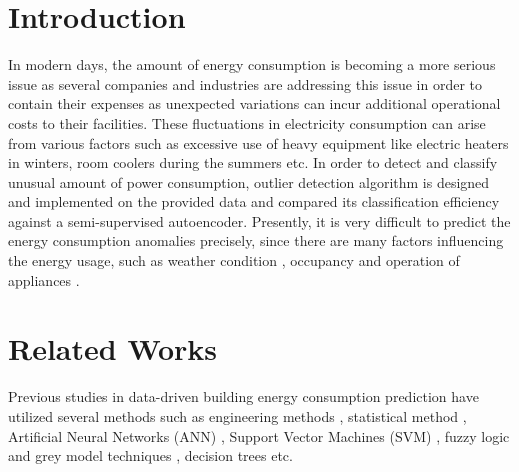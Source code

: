 \documentclass[conference]{IEEEtran}
\begin{document}

\section{Introduction}
In modern days, the amount of energy consumption is becoming a more serious issue as several companies and industries are addressing this issue in order to contain their expenses as unexpected variations can incur additional operational costs to their facilities. These fluctuations in electricity consumption can arise from various factors such as excessive use of heavy equipment like electric heaters in winters, room coolers during the summers etc. In order to detect and classify unusual amount of power consumption, outlier detection algorithm is designed and implemented on the provided data and compared its classification efficiency against a semi-supervised autoencoder.
Presently, it is very difficult to predict the energy consumption anomalies precisely, since there are many factors influencing the energy usage, such as weather condition \cite{bb0},  occupancy \cite{bb1} and operation of appliances \cite{bb2,bb3}. 

\section{Related Works}

Previous studies in data-driven building energy consumption prediction have utilized several methods such as engineering methods \cite{bb4}, statistical method \cite{bb5}, Artificial Neural Networks (ANN) \cite{bb6,bb7}, Support Vector Machines (SVM) \cite{bb8}, fuzzy logic and grey model techniques \cite{bb9}, decision trees \cite{bb10} etc. 
\end{document}
